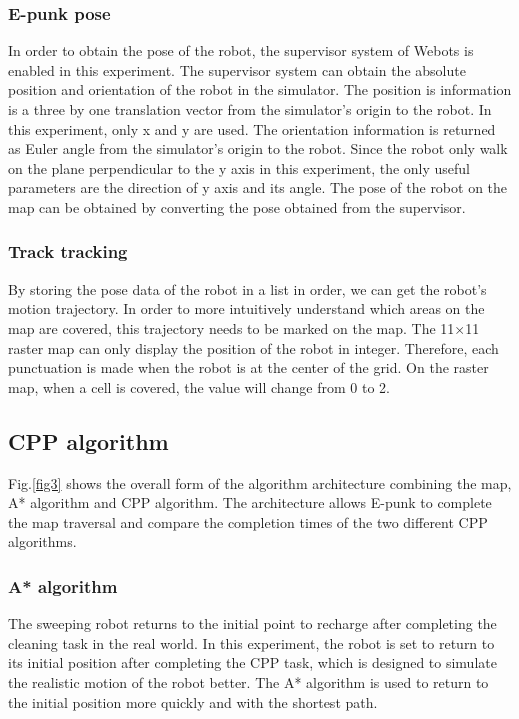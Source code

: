 \documentclass[conference]{IEEEtran}
\begin{document}
\subsubsection{E-punk pose}

In order to obtain the pose of the robot, the supervisor system of Webots is enabled in this experiment. The supervisor system can obtain the absolute position and orientation of the robot in the simulator. The position is information is a three by one translation vector from the simulator's origin to the robot. In this experiment, only x and y are used. The orientation information is returned as Euler angle from the simulator's origin to the robot. Since the robot only walk on the plane perpendicular to the y axis in this experiment, the only useful parameters are the direction of y axis and its angle. The pose of the robot on the map can be obtained by converting the pose obtained from the supervisor. 

\subsubsection{Track tracking}

By storing the pose data of the robot in a list in order, we can get the robot's motion trajectory. In order to more intuitively understand which areas on the map are covered, this trajectory needs to be marked on the map. The 11×11 raster map can only display the position of the robot in integer. Therefore, each punctuation is made when the robot is at the center of the grid. On the raster map, when a cell is covered, the value will change from 0 to 2.

\subsection{CPP algorithm}

Fig.\ref{fig3} shows the overall form of the algorithm architecture combining the map, A* algorithm and CPP algorithm. The architecture allows E-punk to complete the map traversal and compare the completion times of the two different CPP algorithms. 
 
\subsubsection{A* algorithm}
The sweeping robot returns to the initial point to recharge after completing the cleaning task in the real world. In this experiment, the robot is set to return to its initial position after completing the CPP task, which is designed to simulate the realistic motion of the robot better. The A* algorithm\cite{hart1968formal} is used to return to the initial position more quickly and with the shortest path.\\
\end{document}
